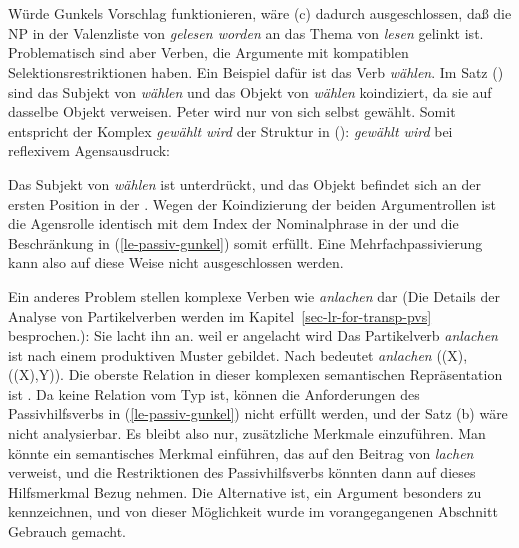 {{{{{                                                   }\\
                                          } }\\
}
\zs
Würde Gunkels Vorschlag funktionieren, wäre (c) dadurch ausgeschlossen,
daß die NP in der Valenzliste von \emph{gelesen worden} an das Thema von \emph{lesen}
gelinkt ist. Problematisch sind aber Verben, die Argumente mit kompatiblen
Selektionsrestriktionen haben. Ein Beispiel dafür ist das Verb \emph{wählen}.
Im Satz () sind das Subjekt von \emph{wählen} und das Objekt von \emph{wählen}
koindiziert, da sie auf dasselbe Objekt verweisen.
\ea
Peter wird nur von sich selbst gewählt.
\z
Somit entspricht der Komplex \emph{gewählt wird} der Struktur in ():
\eas
\emph{gewählt wird} bei reflexivem Agensausdruck:\\
\zs

\noindent
Das Subjekt von \emph{wählen} ist unterdrückt, und das Objekt befindet sich an der ersten
Position in der \subcatl. Wegen der Koindizierung der beiden Argumentrollen ist die
Agensrolle identisch mit dem Index der Nominalphrase in der \subcatl und die Beschränkung
in (\ref{le-passiv-gunkel}) somit erfüllt. Eine Mehrfachpassivierung kann also auf diese Weise
nicht ausgeschlossen werden.

Ein anderes Problem stellen komplexe Verben wie \emph{anlachen} dar (Die Details
der Analyse von Partikelverben werden im Kapitel~\ref{sec-lr-for-transp-pvs} besprochen.):
\eal
\ex Sie lacht ihn an.
\ex weil er angelacht wird
\zl
Das Partikelverb \emph{anlachen} ist nach einem produktiven Muster gebildet. Nach
 bedeutet \emph{anlachen} ((X), ((X),Y)).
Die oberste Relation in dieser komplexen semantischen Repräsentation ist .
Da  keine Relation vom Typ  ist, können die Anforderungen
des Passivhilfsverbs in (\ref{le-passiv-gunkel}) nicht erfüllt werden, und der
Satz (b) wäre nicht analysierbar. Es bleibt also nur, zusätzliche Merkmale einzuführen.
Man könnte ein semantisches Merkmal einführen, das
auf den Beitrag von \emph{lachen} verweist, und die Restriktionen des Passivhilfsverbs
könnten dann auf dieses Hilfsmerkmal Bezug nehmen. Die Alternative ist, ein Argument
besonders zu kennzeichnen, und von dieser Möglichkeit wurde im vorangegangenen Abschnitt
Gebrauch gemacht.

}
